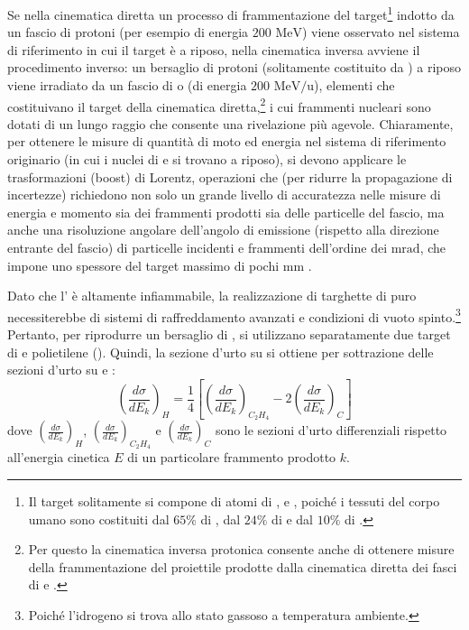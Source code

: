\documentclass[12pt,a4paper,twoside]{report}
\begin{document}
	Se nella cinematica diretta un processo di frammentazione del target\footnote{Il target solitamente si compone di atomi di ,  e , poiché i tessuti del corpo umano sono costituiti dal $65\%$ di , dal $24\%$ di  e dal $10\%$ di .} indotto da un fascio di protoni (per esempio di energia $200\mbox{ MeV}$) viene osservato nel sistema di riferimento in cui il target è a riposo, nella cinematica inversa avviene il procedimento inverso: un bersaglio di protoni (solitamente costituito da ) a riposo viene irradiato da un fascio di  o  (di energia $200\mbox{ MeV/u}$), elementi che costituivano il target della cinematica diretta,\footnote{Per questo la cinematica inversa protonica consente anche di ottenere misure della frammentazione del proiettile prodotte dalla cinematica diretta dei fasci di  e .} i cui frammenti nucleari sono dotati di un lungo raggio che consente una rivelazione più agevole. Chiaramente, per ottenere le misure di quantità di moto ed energia nel sistema di riferimento originario (in cui i nuclei di  e  si trovano a riposo), si devono applicare le trasformazioni (boost) di Lorentz, operazioni che (per ridurre la propagazione di incertezze) richiedono non solo un grande livello di accuratezza nelle misure di energia e momento sia dei frammenti prodotti sia delle particelle del fascio, ma anche una risoluzione angolare dell'angolo di emissione (rispetto alla direzione entrante del fascio) di particelle incidenti e frammenti dell'ordine dei $\mbox{mrad}$, che impone uno spessore del target massimo di pochi $\mbox{mm}$ \cite{foot_cdr}.
	
	Dato che l' è altamente infiammabile, la realizzazione di targhette di  puro necessiterebbe di sistemi di raffreddamento avanzati e condizioni di vuoto spinto.\footnote{Poiché l'idrogeno si trova allo stato gassoso a temperatura ambiente.} Pertanto, per riprodurre un bersaglio di , si utilizzano separatamente due target di  e polietilene (). Quindi, la sezione d'urto su  si ottiene per sottrazione delle sezioni d'urto su  e :
	\begin{equation}
		\left(\frac{d\sigma}{dE_k}\right)_{H}=\frac{1}{4}\left[\left(\frac{d\sigma}{dE_k}\right)_{{C_2H_4}}-2\left(\frac{d\sigma}{dE_k}\right)_{{C}}\right]
		\label{eq:c2h4}
	\end{equation}
	dove $\left(\frac{d\sigma}{dE_k}\right)_{H}$, $\left(\frac{d\sigma}{dE_k}\right)_{{C_2H_4}}$ e $\left(\frac{d\sigma}{dE_k}\right)_{{C}}$ sono le sezioni d'urto differenziali rispetto all'energia cinetica $E$ di un particolare frammento prodotto $k$.
		
\end{document}
